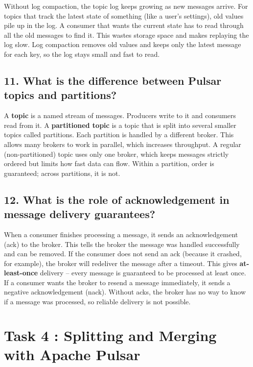 \documentclass[11pt,a4paper]{article}
\begin{document}
Without log compaction, the topic log keeps growing as new messages arrive. For topics
that track the latest state of something (like a user's settings), old values pile up in the
log. A consumer that wants the current state has to read through all the old messages to
find it. This wastes storage space and makes replaying the log slow. Log compaction
removes old values and keeps only the latest message for each key, so the log stays small
and fast to read.

\subsection*{11. What is the difference between Pulsar topics and partitions?}

A \textbf{topic} is a named stream of messages. Producers write to it and consumers read
from it. A \textbf{partitioned topic} is a topic that is split into several smaller topics called
partitions. Each partition is handled by a different broker. This allows many brokers to
work in parallel, which increases throughput. A regular (non-partitioned) topic uses only
one broker, which keeps messages strictly ordered but limits how fast data can flow.
Within a partition, order is guaranteed; across partitions, it is not.

\subsection*{12. What is the role of acknowledgement in message delivery guarantees?}

When a consumer finishes processing a message, it sends an acknowledgement (ack) to the
broker. This tells the broker the message was handled successfully and can be removed.
If the consumer does not send an ack (because it crashed, for example), the broker will
redeliver the message after a timeout. This gives \textbf{at-least-once} delivery -- every
message is guaranteed to be processed at least once. If a consumer wants the broker to
resend a message immediately, it sends a negative acknowledgement (nack). Without acks,
the broker has no way to know if a message was processed, so reliable delivery is not possible.

\section{Task 4 : Splitting and Merging with Apache Pulsar}
\end{document}

